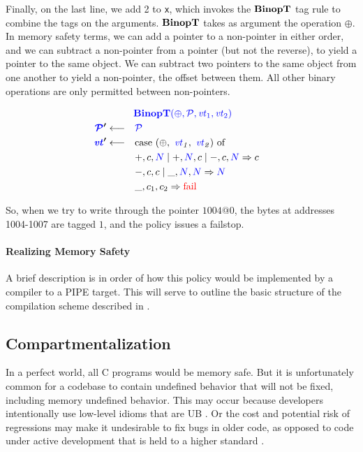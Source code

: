 \documentclass[acmsmall,review,anonymous]{acmart}\settopmatter{printfolios=true,printccs=false,printacmref=false}
\begin{document}
\vspace{\belowdisplayskip}

Finally, on the last line, we add 2 to {\tt x}, which invokes the \(\mathbf{BinopT}\) tag rule
to combine the tags on the arguments. \(\mathbf{BinopT}\) takes as argument the operation \(\oplus\).
In memory safety terms, we can add a pointer to a non-pointer in either order, and we can subtract
a non-pointer from a pointer (but not the reverse), to yield a pointer to the same object. We can
subtract two pointers to the same object from one another to yield a non-pointer, the offset between them.
All other binary operations are only permitted between non-pointers.

\[\begin{aligned}
\truledef{\binopt}
\settag{\PCT'}{\PCT}
\settag{\vt'}{\caseof{(\oplus,~ \vt_1,~ \vt_2)}}
\caseentry{+, c, \N \mid +, \N, c \mid -, c, \N}{c} \\
\caseentry{-, c, c \mid \_, \N, \N}{\N} \\
\caseentry{\_, c_1, c_2}{\textnormal{\color{red} fail}} \\
\end{aligned}\]

So, when we try to write through the pointer \(1004@0\), the bytes at addresses 1004-1007 are
tagged \(1\), and the policy issues a failstop.

\paragraph*{Realizing Memory Safety}

A brief description is in order of how this policy would be implemented by a compiler to a PIPE
target. This will serve to outline the basic structure of the compilation scheme described in
\cite{Chhak21:Tagine}.

\subsection{Compartmentalization}
\label{sec:comp}
In a perfect world, all C programs would be memory safe. But it is unfortunately common
for a codebase to contain undefined behavior that will not be fixed, including memory undefined
behavior. This may occur because developers intentionally use low-level idioms that are UB \cite{DeFacto}.
Or the cost and potential risk of regressions may make it undesirable to fix bugs in older code,
as opposed to code under active development that is held to a higher standard \cite{Bessey10:Coverity}.
\end{document}
